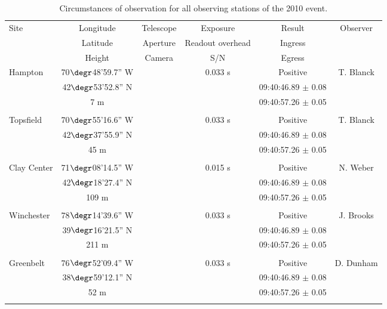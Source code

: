 \begin{table*}
 \centering
 \begin{minipage}{140mm}
  \caption{Circumstances of observation for all observing stations of the 2010 event.}
  \begin{tabular}{@{}lccccc}
  \hline
     Site & Longitude & Telescope & Exposure & Result & Observer  \\
          & Latitude  & Aperture  & Readout overhead  & Ingress & \\          
          & Height    & Camera    &    S/N    & Egress    & \\          
\hline
 Hampton & 70$\degr$48'59.7'' W &  & 0.033 s & Positive & T. Blanck \\
  &42$\degr$53'52.8'' N &  &     & 09:40:46.89 $\pm$ 0.08 &   \\
            & 7 m                &       &     & 09:40:57.26  $\pm$ 0.05 &   \\
 & & & & & \\
 Topsfield & 70$\degr$55'16.6'' W &  & 0.033 s & Positive & T. Blanck \\
  &42$\degr$37'55.9'' N &  &     & 09:40:46.89 $\pm$ 0.08 &   \\
            & 45 m                &       &     & 09:40:57.26  $\pm$ 0.05 &   \\
 & & & & & \\
 Clay Center & 71$\degr$08'14.5'' W &  & 0.015 s & Positive & N. Weber \\
  &42$\degr$18'27.4'' N &  &     & 09:40:46.89 $\pm$ 0.08 &   \\
            & 109 m                &       &     & 09:40:57.26  $\pm$ 0.05 &   \\
 & & & & & \\
 Winchester & 78$\degr$14'39.6'' W &  & 0.033 s & Positive & J. Brooks \\
  &39$\degr$16'21.5'' N &  &     & 09:40:46.89 $\pm$ 0.08 &   \\
            & 211 m                &       &     & 09:40:57.26  $\pm$ 0.05 &   \\
 & & & & & \\
 Greenbelt & 76$\degr$52'09.4'' W &  & 0.033 s & Positive & D. Dunham \\
  &38$\degr$59'12.1'' N &  &     & 09:40:46.89 $\pm$ 0.08 &   \\
            & 52 m                &       &     & 09:40:57.26  $\pm$ 0.05 &   \\
 & & & & & \\

\end{tabular}
\end{minipage}
\end{table*}
